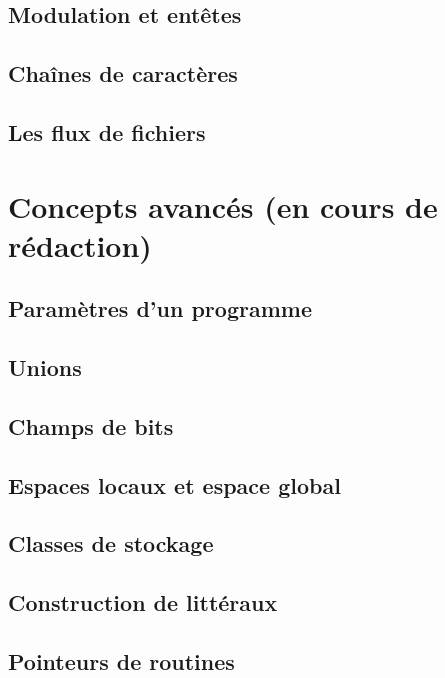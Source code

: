 \documentclass[french]{minitelreport}
\begin{document}
		\section{Modulation et entêtes}
		
		\section{Chaînes de caractères}
		
		\section{Les flux de fichiers}
		
	\chapter{Concepts avancés (en cours de rédaction)}
		\section{Paramètres d'un programme}
		
		\section{Unions}
		
		\section{Champs de bits}
		
		\section{Espaces locaux et espace global}
		
		\section{Classes de stockage}
		
		\section{Construction de littéraux}
		
		\section{Pointeurs de routines}
		
\end{document}
